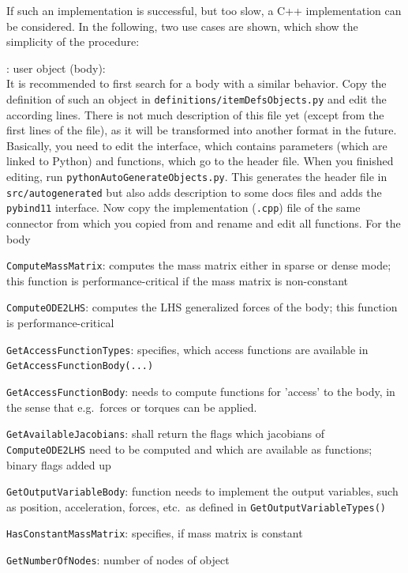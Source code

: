If such an implementation is successful, but too slow, a C++ implementation can be considered.
In the following, two use cases are shown, which show the simplicity of the procedure:
\bi
  \item {}: user object (body):\\
  It is recommended to first search for a body with a similar behavior.
  Copy the definition of such an object in \texttt{definitions/itemDefsObjects.py} and edit the according lines. 
  There is not much description of 
  this file yet (except from the first lines of the file), as it will be transformed into another format in the future.
  Basically, you need to edit the interface, which contains parameters (which are linked to Python) and functions, 
  which go to the header file.
  When you finished editing, run \texttt{pythonAutoGenerateObjects.py}. This generates the header file in \texttt{src/autogenerated}
  but also adds description to some docs files and adds the \texttt{pybind11} interface. 
  Now copy the implementation (\texttt{.cpp}) file of the same connector from which you copied from and rename and edit all functions.
  For the body
  \bi
    \item \texttt{ComputeMassMatrix}: computes the mass matrix either in sparse or dense mode; this function is performance-critical if the mass matrix is non-constant
    \item \texttt{ComputeODE2LHS}: computes the \ac{LHS} generalized forces of the body; this function is performance-critical
    \item \texttt{GetAccessFunctionTypes}: specifies, which access functions are available in \\ \texttt{GetAccessFunctionBody(...)}
    \item \texttt{GetAccessFunctionBody}: needs to compute functions for 'access' to the body, in the sense that e.g.\ forces or torques can be applied. 
    \item \texttt{GetAvailableJacobians}: shall return the flags which jacobians of \texttt{ComputeODE2LHS} need to be computed and which are available as functions; binary flags added up
    \item \texttt{GetOutputVariableBody}: function needs to implement the output variables, such as position, acceleration, forces, etc.\ as defined in \texttt{GetOutputVariableTypes()}
    \item \texttt{HasConstantMassMatrix}: specifies, if mass matrix is constant
    \item \texttt{GetNumberOfNodes}: number of nodes of object
